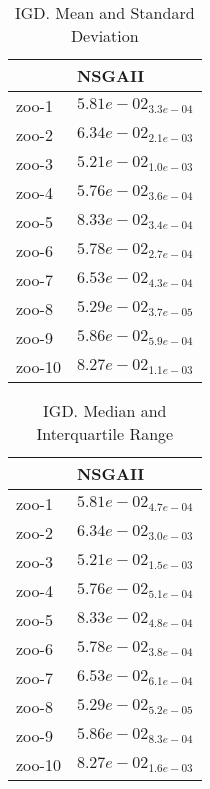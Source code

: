 \documentclass{article}
\begin{document}
\begin{table}
\caption{IGD. Mean and Standard Deviation}
\label{table: IGD}
\centering
\begin{scriptsize}
\begin{tabular}{ll}
\hline &  NSGAII\\
\hline 
zoo-1 & \cellcolor{gray95}$  5.81e-02_{ 3.3e-04}$ \\
zoo-2 & \cellcolor{gray95}$  6.34e-02_{ 2.1e-03}$ \\
zoo-3 & \cellcolor{gray95}$  5.21e-02_{ 1.0e-03}$ \\
zoo-4 & \cellcolor{gray95}$  5.76e-02_{ 3.6e-04}$ \\
zoo-5 & \cellcolor{gray95}$  8.33e-02_{ 3.4e-04}$ \\
zoo-6 & \cellcolor{gray95}$  5.78e-02_{ 2.7e-04}$ \\
zoo-7 & \cellcolor{gray95}$  6.53e-02_{ 4.3e-04}$ \\
zoo-8 & \cellcolor{gray95}$  5.29e-02_{ 3.7e-05}$ \\
zoo-9 & \cellcolor{gray95}$  5.86e-02_{ 5.9e-04}$ \\
zoo-10 & \cellcolor{gray95}$  8.27e-02_{ 1.1e-03}$ \\
\hline
\end{tabular}
\end{scriptsize}
\end{table}

\begin{table}
\caption{IGD. Median and Interquartile Range}
\label{table: IGD}
\centering
\begin{scriptsize}
\begin{tabular}{ll}
\hline &  NSGAII\\
\hline 
zoo-1 & \cellcolor{gray95}$  5.81e-02_{ 4.7e-04}$ \\
zoo-2 & \cellcolor{gray95}$  6.34e-02_{ 3.0e-03}$ \\
zoo-3 & \cellcolor{gray95}$  5.21e-02_{ 1.5e-03}$ \\
zoo-4 & \cellcolor{gray95}$  5.76e-02_{ 5.1e-04}$ \\
zoo-5 & \cellcolor{gray95}$  8.33e-02_{ 4.8e-04}$ \\
zoo-6 & \cellcolor{gray95}$  5.78e-02_{ 3.8e-04}$ \\
zoo-7 & \cellcolor{gray95}$  6.53e-02_{ 6.1e-04}$ \\
zoo-8 & \cellcolor{gray95}$  5.29e-02_{ 5.2e-05}$ \\
zoo-9 & \cellcolor{gray95}$  5.86e-02_{ 8.3e-04}$ \\
zoo-10 & \cellcolor{gray95}$  8.27e-02_{ 1.6e-03}$ \\
\hline
\end{tabular}
\end{scriptsize}
\end{table}
\end{document}

